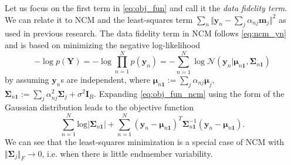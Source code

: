 \documentclass[twocolumn,english]{IEEEtran}
\theoremstyle{plain}
\begin{document}
Let us focus on the first term in \eqref{eq:obj_fun} and call it
the \emph{data fidelity term}. We can relate it to NCM and the least-squares
term $\sum_{n}\Vert\mathbf{y}_{n}-\sum_{j}\alpha_{nj}\mathbf{m}_{j}\Vert^{2}$
as used in previous research. The data fidelity term in NCM follows
\eqref{eq:ncm_yn} and is based on minimizing the negative log-likelihood
\begin{equation}
-\log p\left(\mathbf{Y}\right)=-\log\prod_{n=1}^{N}p\left(\mathbf{y}_{n}\right)=-\sum_{n=1}^{N}\log\mathcal{N}\left(\mathbf{y}_{n}\vert\boldsymbol{\mu}_{n\mathbf{1}},\boldsymbol{\Sigma}_{n\mathbf{1}}\right)\label{eq:obj_fun_ncm}
\end{equation}
by assuming $\mathbf{y}_{n}$s are independent, where $\boldsymbol{\mu}_{n\mathbf{1}}:=\sum_{j}\alpha_{nj}\boldsymbol{\mu}_{j}$,
$\boldsymbol{\Sigma}_{n\mathbf{1}}:=\sum_{j}\alpha_{nj}^{2}\boldsymbol{\Sigma}_{j}+\sigma^{2}\mathbf{I}_{B}$.
Expanding \eqref{eq:obj_fun_ncm} using the form of the Gaussian distribution
leads to the objective function
\begin{equation}
\sum_{n=1}^{N}\text{log}\left|\boldsymbol{\Sigma}_{n\mathbf{1}}\right|+\sum_{n=1}^{N}\left(\mathbf{y}_{n}-\boldsymbol{\mu}_{n\mathbf{1}}\right)^{T}\boldsymbol{\Sigma}_{n\mathbf{1}}^{-1}\left(\mathbf{y}_{n}-\boldsymbol{\mu}_{n\mathbf{1}}\right).\label{eq:obj_fun_ncm1}
\end{equation}
We can see that the least-squares minimization is a special case of
NCM with $\Vert\boldsymbol{\Sigma}_{j}\Vert_{F}\rightarrow0$, i.e.
when there is little endmember variability.
\end{document}
